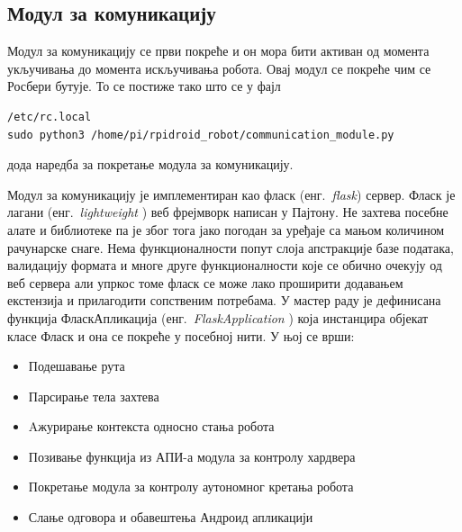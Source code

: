 \documentclass[12pt,oneside]{memoir}
\theoremstyle{remark}
\begin{document}
\subsection{Модул за комуникацију}
Модул за комуникацију се први покреће и он мора бити активан од момента укључивања до момента искључивања робота. Овај модул се покреће чим се Росбери бутује. То се постиже тако што се у фајл 
\begin{lstlisting}
/etc/rc.local
sudo python3 /home/pi/rpidroid_robot/communication_module.py
\end{lstlisting}
дода наредба за покретање модула за комуникацију.

Модул за комуникацију је имплементиран као фласк (енг.~{\em flask}) сервер. Фласк је лагани  (енг.~{\em light\-weight }) веб фрејмворк написан у Пајтону. Не захтева посебне алате и библиотеке па је због тога јако погодан за уређаје са мањом количином рачунарске снаге. Нема функционалности попут слоја апстракције базе података, валидацију формата и многе друге функционалности које се обично очекују од веб сервера али упркос томе фласк се може лако проширити додавањем екстензија и прилагодити сопственим потребама.
У мастер раду је дефинисана функција ФласкАпликација (енг.~{\em FlaskApplication }) која инстанцира објекат класе Фласк и она се покреће у посебној нити.  У њој се врши:
\begin{itemize}
\item Подешавање рута
\item Парсирање тела захтева 
\item Aжурирање контекста односно стања робота
\item Позивање функција из АПИ-а модула за контролу хардвера
\item Покретање модула за контролу аутономног кретања робота
\item Слање одговора и обавештења Андроид апликацији
\end{itemize}
\end{document}
